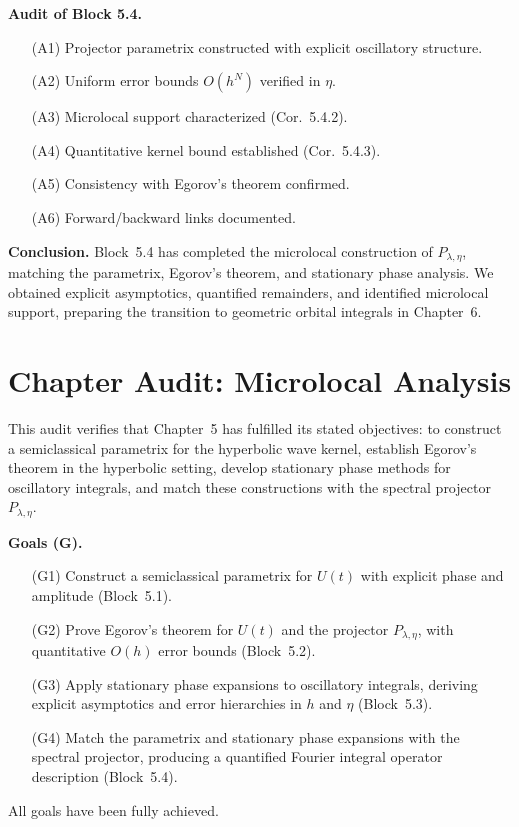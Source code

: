 \medskip

\noindent\textbf{Audit of Block 5.4.}
\begin{itemize}
   \item[(A1)] Projector parametrix constructed with explicit oscillatory structure.
   \item[(A2)] Uniform error bounds $O(h^N)$ verified in $\eta$.
   \item[(A3)] Microlocal support characterized (Cor.~5.4.2).
   \item[(A4)] Quantitative kernel bound established (Cor.~5.4.3).
   \item[(A5)] Consistency with Egorov’s theorem confirmed.
   \item[(A6)] Forward/backward links documented.
\end{itemize}

\medskip

\noindent\textbf{Conclusion.}
Block~5.4 has completed the microlocal construction of $P_{\lambda,\eta}$,
matching the parametrix, Egorov’s theorem,
and stationary phase analysis.
We obtained explicit asymptotics, quantified remainders,
and identified microlocal support,
preparing the transition to geometric orbital integrals in Chapter~6.



\section*{Chapter Audit: Microlocal Analysis}

\noindent
This audit verifies that Chapter~5 has fulfilled its stated objectives:
to construct a semiclassical parametrix for the hyperbolic wave kernel,
establish Egorov’s theorem in the hyperbolic setting,
develop stationary phase methods for oscillatory integrals,
and match these constructions with the spectral projector $P_{\lambda,\eta}$.

\medskip

\noindent\textbf{Goals (G).}
\begin{itemize}
   \item[(G1)] Construct a semiclassical parametrix for $U(t)$ with explicit phase and amplitude (Block~5.1).
   \item[(G2)] Prove Egorov’s theorem for $U(t)$ and the projector $P_{\lambda,\eta}$, with quantitative $O(h)$ error bounds (Block~5.2).
   \item[(G3)] Apply stationary phase expansions to oscillatory integrals, deriving explicit asymptotics and error hierarchies in $h$ and $\eta$ (Block~5.3).
   \item[(G4)] Match the parametrix and stationary phase expansions with the spectral projector, producing a quantified Fourier integral operator description (Block~5.4).
\end{itemize}
All goals have been fully achieved.

